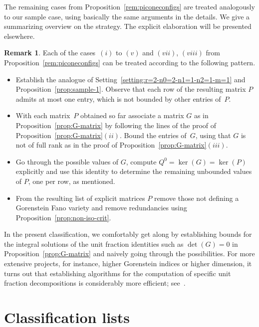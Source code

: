 \documentclass[10pt,a4paper]{amsart}
\theoremstyle{definition}
\newtheorem{rema}[thm]{Remark}
\numberwithin{equation}{section}
\begin{document}
The remaining cases from Proposition~\ref{rem:piconeconfigs}
are treated analogously to our sample case, using basically
the same arguments in the details. We give a summarizing
overview on the strategy. The explicit elaboration will be
presented elsewhere.


\begin{rema}
Each of the cases~$(i)$ to $(v)$ and $(vii)$, $(viii)$ from
Proposition~\ref{rem:piconeconfigs} can be
treated according to the following pattern.
\begin{itemize}
\item
Establish the analogue of
Setting~\ref{setting:r=2-n0=2-n1=1-n2=1-m=1}
and Proposition~\ref{prop:sample-1}.
Observe that each row of the resulting
matrix $P$ admits at most one entry,
which is not bounded by other entries of~$P$.
\item
With each matrix~$P$ obtained so far
associate a matrix $G$ as in
Proposition~\ref{prop:G-matrix} by following
the lines of the proof of Proposition~\ref{prop:G-matrix}$(ii)$.
Bound the entries of~$G$, using that $G$ is not
of full rank as in the proof of Proposition~\ref{prop:G-matrix}$(iii)$.
\item
Go through the possible values of $G$,
compute $Q^0 = \ker(G) = \ker(P)$ explicitly
and use this identity to determine the remaining
unbounded values of $P$, one per row, as mentioned.
\item
From the resulting list of explicit matrices $P$ remove
those not defining a Gorenstein Fano variety
and remove redundancies using
Proposition~\ref{prop:non-iso-crit}.
\end{itemize}
\end{rema}


In the present classification, we comfortably
get along by establishing bounds for the integral
solutions of the unit fraction identities such as
$\det(G) = 0$ in Proposition~\ref{prop:G-matrix}
and naively going through the possibilities.
For more extensive projects, for instance, higher
Gorenstein indices or higher dimension, it
turns out that establishing algorithms for
the computation of specific unit fraction decompositions
is considerably more efficient; see~\cite{Ba,HaHaHaSp}.


\newpage

\section{Classification lists}
\label{sec:class-lists}
\end{document}
